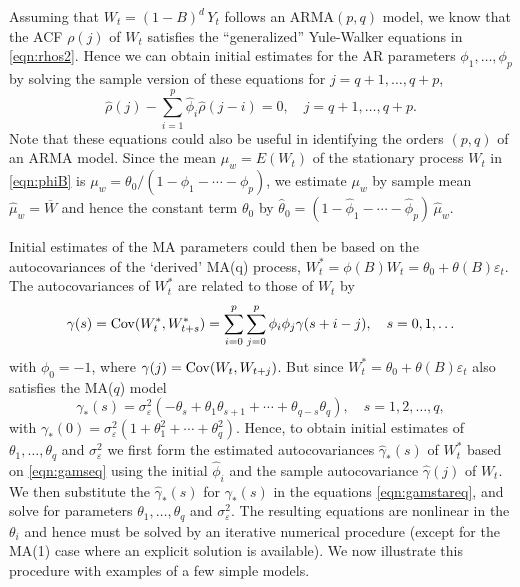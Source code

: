 Assuming that $W_t= (1 - B)^d\, Y_t$ follows an ARMA$(p,q)$ model, we know that the ACF $\rho(j)$ of $W_t$ satisfies the ``generalized'' Yule-Walker equations in \eqref{eqn:rhos2}. Hence we can obtain initial estimates for the AR parameters $\phi_1, \ldots, \phi_p$ by solving the sample version of these equations for $j= q+1,\ldots, q+p$,
	\begin{equation} \label{eqn:rhohatsum}
	\hat{\rho}(j) - \sum_{i=1}^p \hat{\phi}_i \hat{\rho}(j-i) = 0, \quad j= q+1, \ldots, q+p.
	\end{equation}
Note that these equations could also be useful in identifying the orders $(p,q)$ of an ARMA model. Since the mean $\mu_w = E(W_t)$ of the stationary process $W_t$ in \eqref{eqn:phiB} is $\mu_w = \theta_0/(1 - \phi_1 - \cdots - \phi_p)$, we estimate $\mu_w$ by sample mean $\hat{\mu}_w = \overline{W}$ and hence the constant term $\theta_0$ by $\hat{\theta}_0 = (1 - \hat{\phi}_1 - \cdots - \hat{\phi}_p)\, \hat{\mu}_w$.


Initial estimates of the MA parameters could then be based on the autocovariances of the `derived' MA(q) process, $W_t^* = \phi(B) W_t = \theta_0 + \theta(B) \varepsilon_t$. The autocovariances of $W_t^*$ are related to those of $W_t$ by
	\begin{equation} \label{eqn:gamseq}
	\gamma(s) = \cov(W_t^*, W_{t+s}^*) = \sum_{i=0}^p \sum_{j=0}^p \phi_i \phi_j \gamma(s+i-j), \quad s = 0,1,\ldots
	\end{equation}
with $\phi_0 = -1$, where $\gamma(j) = \operatorname{Cov}(W_t, W_{t+j})$. But since $W_t^* = \theta_0 + \theta(B)\varepsilon_t$ also satisfies the MA($q$) model
	\begin{equation} \label{eqn:gamstareq}
	\gamma_*(s) = \sigma_{\varepsilon}^2 (-\theta_s + \theta_1 \theta_{s+1} + \cdots + \theta_{q-s}\theta_q), \quad s = 1,2,\ldots,q,
	\end{equation}
with $\gamma_*(0) = \sigma_{\varepsilon}^2 (1 + \theta_1^2 + \cdots + \theta_q^2)$. Hence, to obtain initial estimates of $\theta_1, \ldots, \theta_q$ and $\sigma_{\varepsilon}^2$ we first form the estimated autocovariances $\hat{\gamma}_*(s)$ of $W_t^*$ based on \eqref{eqn:gamseq} using the initial $\hat{\phi}_{i}$ and the sample autocovariance $\hat{\gamma}(j)$ of $W_t$. We then substitute the $\hat{\gamma}_*(s)$ for $\gamma_*(s)$ in the equations \eqref{eqn:gamstareq}, and solve for parameters $\theta_1, \ldots, \theta_q$ and $\sigma_{\varepsilon}^2$. The resulting equations are nonlinear in the $\theta_i$ and hence must be solved by an iterative numerical procedure (except for the MA(1) case where an explicit solution is available). We now illustrate this procedure with examples of a few simple models. 


